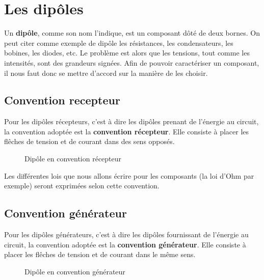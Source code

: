 \pagebreak
\section{Les dipôles}

Un \textbf{dipôle}, comme son nom l'indique, est un composant dôté de deux bornes. On peut citer comme exemple de dipôle les résistances, les condensateurs, les bobines, les diodes, etc. Le problème est alors que les tensions, tout comme les intensités, sont des grandeurs signées. Afin de pouvoir caractériser un composant, il nous faut donc se mettre d'accord sur la manière de les choisir.

\subsection*{Convention recepteur}

Pour les dipôles récepteurs, c'est à dire les dipôles prenant de l'énergie au circuit, la convention adoptée est la \textbf{convention récepteur}. Elle consiste à placer les flêches de tension et de courant dans des sens opposés. 

\begin{figure}[!h]
\centering

\caption{Dipôle en convention récepteur}
\end{figure}

Les différentes lois que nous allons écrire pour les composants (la loi d'Ohm par exemple) seront exprimées selon cette convention.

\subsection*{Convention générateur}

Pour les dipôles générateurs, c'est à dire les dipôles fournissant de l'énergie au circuit, la convention adoptée est la \textbf{convention générateur}. Elle consiste à placer les flêches de tension et de courant dans le même sens. 

\begin{figure}[!h]
\centering

\caption{Dipôle en convention générateur}
\end{figure}

